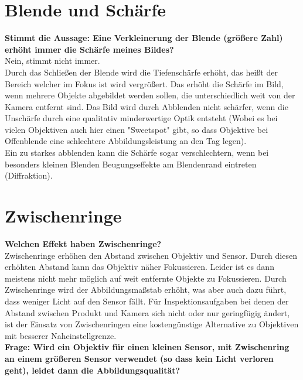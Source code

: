 \documentclass[a4paper]{article}
\begin{document}
	\section{Blende und Schärfe}
	\textbf{Stimmt die Aussage: Eine Verkleinerung der Blende (größere Zahl) erhöht immer die Schärfe meines Bildes?}\\
	Nein, stimmt nicht immer.\\
	Durch das Schließen der Blende wird die Tiefenschärfe erhöht, das heißt der Bereich welcher im Fokus ist wird vergrößert. Das erhöht die Schärfe im Bild, wenn mehrere Objekte abgebildet werden sollen, die unterschiedlich weit von der Kamera entfernt sind. Das Bild wird durch Abblenden nicht schärfer, wenn die Unschärfe durch eine qualitativ minderwertige Optik entsteht (Wobei es bei vielen Objektiven auch hier einen "Sweetspot" gibt, so dass Objektive bei Offenblende eine schlechtere Abbildungsleistung an den Tag legen).\\
	Ein zu starkes abblenden kann die Schärfe sogar verschlechtern, wenn bei besonders kleinen Blenden Beugungseffekte am Blendenrand eintreten (Diffraktion).\\
	
	\newpage
	
	\section{Zwischenringe}
	\textbf{Welchen Effekt haben Zwischenringe?}\\
	Zwischenringe erhöhen den Abstand zwischen Objektiv und Sensor. Durch diesen erhöhten Abstand kann das Objektiv näher Fokussieren. Leider ist es dann meistens nicht mehr möglich auf weit entfernte Objekte zu Fokussieren. Durch Zwischenringe wird der Abbildungsmaßstab erhöht, was aber auch dazu führt, dass weniger Licht auf den Sensor fällt. Für Inspektionsaufgaben bei denen der Abstand zwischen Produkt und Kamera sich nicht oder nur geringfügig ändert, ist der Einsatz von Zwischenringen eine kostengünstige Alternative zu Objektiven mit besserer Naheinstellgrenze.\\
	\textbf{Frage: Wird ein Objektiv für einen kleinen Sensor, mit Zwischenring an einem größeren Sensor verwendet (so dass kein Licht verloren geht), leidet dann die Abbildungsqualität?}\\
	
\end{document}

